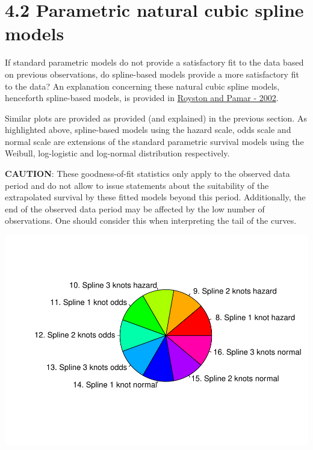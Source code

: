 \documentclass[
]{article}
\begin{document}
\clearpage

\hypertarget{parametric-natural-cubic-spline-models}{%
\section{4.2 Parametric natural cubic spline
models}\label{parametric-natural-cubic-spline-models}}

If standard parametric models do not provide a satisfactory fit to the
data based on previous observations, do spline-based models provide a
more satisfactory fit to the data? An explanation concerning these
natural cubic spline models, henceforth spline-based models, is provided
in \href{https://doi.org/10.1002/sim.1203}{Royston and Pamar - 2002}.

Similar plots are provided as provided (and explained) in the previous
section. As highlighted above, spline-based models using the hazard
scale, odds scale and normal scale are extensions of the standard
parametric survival models using the Weibull, log-logistic and
log-normal distribution respectively.

\textbf{CAUTION}: These goodness-of-fit statistics only apply to the
observed data period and do not allow to issue statements about the
suitability of the extrapolated survival by these fitted models beyond
this period. Additionally, the end of the observed data period may be
affected by the low number of observations. One should consider this
when interpreting the tail of the curves.

\begin{flushleft}\includegraphics{Images/spline-1} \end{flushleft}
\end{document}
